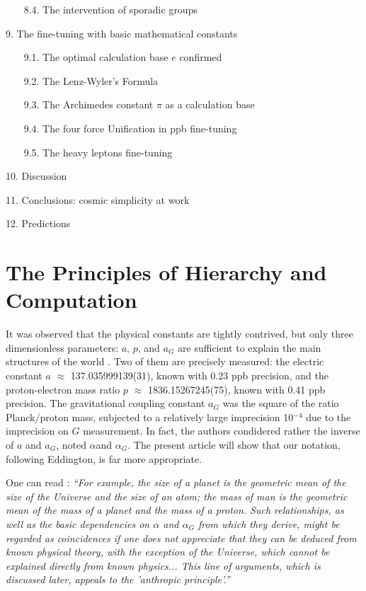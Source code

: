 \documentclass[twoside,draft]{article}
\begin{document}
\begin{sloppypar}
~~~    8.4. The intervention of sporadic groups
   
 9. The fine-tuning with basic mathematical constants
 
~~~    9.1. The optimal calculation base $e$ confirmed
   
~~~    9.2. The Lenz-Wyler's Formula
   
~~~    9.3. The Archimedes constant $\pi$ as a calculation base
   
~~~    9.4. The four force Unification in ppb fine-tuning
   
~~~    9.5. The heavy leptons fine-tuning
   
 10. Discussion
 
 11. Conclusions: cosmic simplicity at work
 
 12. Predictions
    
\section{The Principles of Hierarchy and Computation}

It was observed that the physical constants are tightly contrived, but only three dimensionless parameters: $a$, $p$, and $a_{G}$ are sufficient to explain the main structures of the world \cite{Carr}. Two of them are precisely measured: the electric constant $a$ $\approx$ 137.035999139(31), known with 0.23 ppb precision, and the proton-electron mass ratio $p$ $\approx$ 1836.15267245(75), known with 0.41 ppb precision. The gravitational coupling constant $a_{G}$ was the square of the ratio Planck/proton mass, subjected to a relatively large imprecision 10$^{-4}\!$ due to the imprecision on $G$ measurement. In fact, the authors condidered rather the inverse of $a$ and $a_G$, noted $\alpha$and $\alpha_G$. The present article will show that our notation, following Eddington, is far more appropriate.

One can read \cite{Carr}: \textit{“For example, the size of a planet is the geometric mean of the size of the Universe and the size of an atom; the mass of man is the geometric mean of the mass of a planet and the mass of a proton. Such relationships, as well as the basic dependencies on $\alpha$ and $\alpha_G$ from which they derive, might be regarded as coincidences if one does not appreciate that they can be deduced from known physical theory, with the exception of the Universe, which cannot be explained directly from known physics... This line of arguments, which is discussed later, appeals to the 'anthropic principle'.”}


\end{sloppypar}
\end{document}
